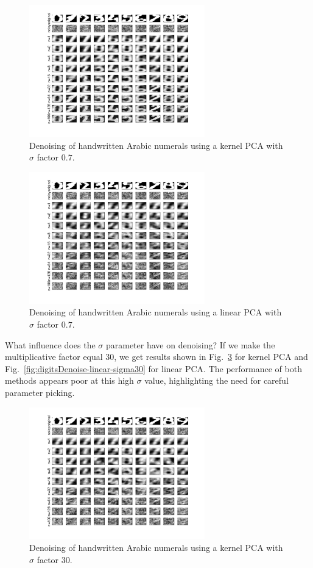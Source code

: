 \documentclass[10pt,a4paper]{article}
\begin{document}
\begin{figure}[h!]
\centering
  \includegraphics[width=3in]{digitsDenoise-kernel.png}
  \caption{Denoising of handwritten Arabic numerals using a kernel PCA with $\sigma$ factor $0.7$.}
  \label{fig:digitsDenoise-kernel}
\end{figure}

\begin{figure}[h!]
\centering
  \includegraphics[width=3in]{digitsDenoise-linear.png}
  \caption{Denoising of handwritten Arabic numerals using a linear PCA with $\sigma$ factor $0.7$.}
  \label{fig:digitsDenoise-linear}
\end{figure}

What influence does the $\sigma$ parameter have on denoising? If we make the multiplicative factor equal $30$, we get results shown in Fig.~\ref{fig:digitsDenoise-kernel-sigma30} for kernel PCA and Fig.~\ref{fig:digitsDenoise-linear-sigma30} for linear PCA. The performance of both methods appears poor at this high $\sigma$ value, highlighting the need for careful parameter picking.

\begin{figure}[h!]
\centering
  \includegraphics[width=3in]{digitsDenoise-kernel-sigma30.png}
  \caption{Denoising of handwritten Arabic numerals using a kernel PCA with $\sigma$ factor $30$.}
  \label{fig:digitsDenoise-kernel-sigma30}
\end{figure}
\end{document}

